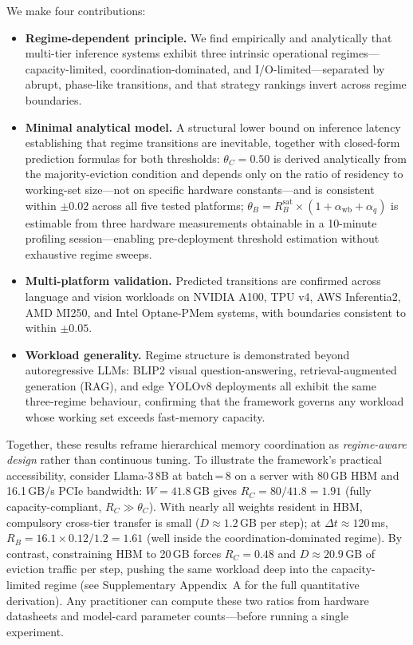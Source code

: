We make four contributions:
\begin{itemize}
  \item \textbf{Regime-dependent principle.}
    We find empirically and analytically that multi-tier inference systems
    exhibit three intrinsic operational regimes---capacity-limited,
    coordination-dominated, and I/O-limited---separated by abrupt,
    phase-like transitions, and that strategy rankings invert across
    regime boundaries.
  \item \textbf{Minimal analytical model.}
    A structural lower bound on inference latency establishing that regime
    transitions are inevitable, together with closed-form prediction formulas
    for both thresholds: $\theta_C = 0.50$ is derived analytically from the
    majority-eviction condition and depends only on the ratio of residency to
    working-set size---not on specific hardware constants---and is consistent
    within $\pm 0.02$ across all five tested platforms; $\theta_B =
    R_B^{\mathrm{sat}} \times (1 + \alpha_{\mathrm{wb}} + \alpha_q)$
    is estimable from three hardware measurements obtainable in a 10-minute
    profiling session---enabling pre-deployment threshold estimation without
    exhaustive regime sweeps.
  \item \textbf{Multi-platform validation.}
    Predicted transitions are confirmed across language and vision workloads
    on NVIDIA A100, TPU v4, AWS Inferentia2, AMD MI250, and Intel Optane-PMem
    systems, with boundaries consistent to within $\pm 0.05$.
  \item \textbf{Workload generality.}
    Regime structure is demonstrated beyond autoregressive LLMs: BLIP2
    visual question-answering, retrieval-augmented generation (RAG), and
    edge YOLOv8 deployments all exhibit the same three-regime behaviour,
    confirming that the framework governs any workload whose working set
    exceeds fast-memory capacity.
\end{itemize}

Together, these results reframe hierarchical memory coordination as
\emph{regime-aware design} rather than continuous tuning.
To illustrate the framework's practical accessibility, consider Llama-3\,8B at
batch\,=\,8 on a server with 80\,GB HBM and 16.1\,GB/s PCIe bandwidth:
$W = 41.8$\,GB gives $R_C = 80/41.8 = 1.91$ (fully capacity-compliant,
$R_C \gg \theta_C$).
With nearly all weights resident in HBM, compulsory cross-tier transfer is
small ($D \approx 1.2$\,GB per step); at $\Delta t \approx 120$\,ms,
$R_B = 16.1 \times 0.12 / 1.2 = 1.61$ (well inside the coordination-dominated
regime).
By contrast, constraining HBM to 20\,GB forces $R_C = 0.48$ and
$D \approx 20.9$\,GB of eviction traffic per step, pushing the same workload
deep into the capacity-limited regime (see Supplementary Appendix~A for the
full quantitative derivation).
Any practitioner can compute these two ratios from hardware datasheets and
model-card parameter counts---before running a single experiment.

\FloatBarrier
